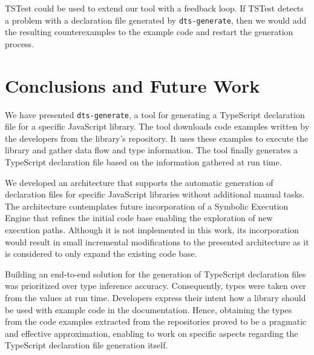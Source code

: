 \documentclass[english,cleveref,autoref,submission]{programming}
\begin{document}


TSTest could be used to extend our tool with a feedback loop. If TSTest detects a problem
with a declaration file generated by \texttt{dts-generate}, then we would add the
resulting counterexamples to the example code and restart the generation process. 

\section{Conclusions and Future Work}
\label{sec:conclusion}
We have presented \texttt{dts-generate}, a tool for generating a TypeScript declaration
file for a specific JavaScript library. The tool downloads code examples written by the
developers from the library's repository. It uses these examples to execute the library and
gather data flow and type information. The tool finally generates a TypeScript declaration
file based on the information gathered at run time.

We developed an architecture that supports the automatic generation of declaration files
for specific JavaScript libraries without additional manual tasks. The architecture
contemplates future incorporation of a Symbolic Execution Engine that refines the
initial code base enabling the exploration of new execution paths. Although it is not
implemented 
in this work, its incorporation would result in small incremental modifications to the
presented architecture as it is considered to only expand the existing code base.

Building an end-to-end solution for the generation of TypeScript declaration files was
prioritized over type inference accuracy. Consequently, types were taken over from the
values at run time. Developers express their intent how a library should be used with
example code in the documentation. Hence,
obtaining the types from the code examples extracted from the repositories proved to be a
pragmatic and effective approximation, enabling to work on specific aspects regarding the
TypeScript declaration file generation itself.
\end{document}
